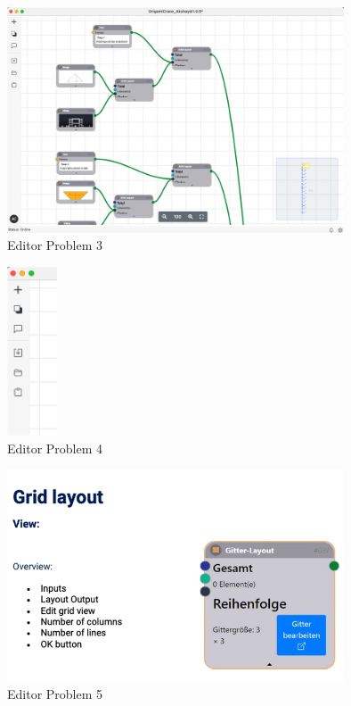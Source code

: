 \documentclass[conference,onecolumn]{IEEEtran}
\begin{document}
    \begin{figure}[H]
        \centerline{\includegraphics[width=100mm,scale=1]{./images/Editor_Problem_3.png}}
        \caption{Editor Problem 3}
        \label{Editor Problem 3}
    \end{figure}   
    \begin{figure}[H]
        \centerline{\includegraphics[height=50mm,scale=1]{./images/Editor_Problem_4.png}}
        \caption{Editor Problem 4}
        \label{Editor Problem 4}
    \end{figure}   
    \begin{figure}[H]
        \centerline{\includegraphics[width=100mm,scale=1]{./images/Editor_Problem_5.png}}
        \caption{Editor Problem 5}
        \label{Editor Problem 5}
    \end{figure}   
\end{document}
